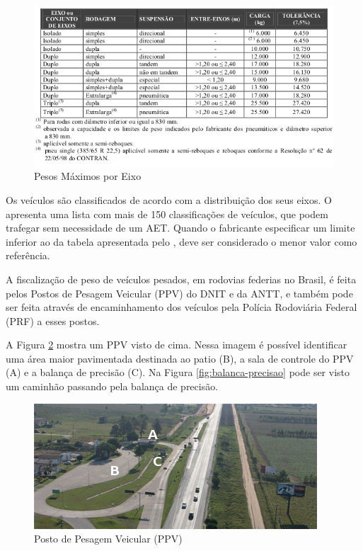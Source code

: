 \documentclass{ufscThesis}
\begin{document}
\begin{figure}[h!]
  \caption{Pesos Máximos por Eixo \cite{tech:dnit-qvf}}
  \label{fig:peso-max-por-eixo}
  \centering
    \includegraphics[scale=0.5]{./figuras/tabela-peso-por-eixo.png}
\end{figure}

Os veículos são classificados de acordo com a distribuição dos seus eixos. O  apresenta uma lista com mais de 150 classificações de veículos, que podem trafegar sem necessidade de um AET. Quando o fabricante especificar um limite inferior ao da tabela apresentada pelo , deve ser considerado o menor valor como referência.

A fiscalização de peso de veículos pesados, em rodovias federias no Brasil, é feita pelos Postos de Pesagem Veicular (PPV) do DNIT e da ANTT, e também pode ser feita através de encaminhamento dos veículos pela Polícia Rodoviária Federal (PRF) a esses postos.

A Figura \ref{fig:ppv} mostra um PPV visto de cima. Nessa imagem é possível identificar uma área maior pavimentada destinada ao patio (B), a sala de controle do PPV (A) e a balança de precisão (C). Na Figura \ref{fig:balanca-precisao} pode ser visto um caminhão passando pela balança de precisão.

\begin{figure}[h!]
  \caption{Posto de Pesagem Veicular (PPV)}
  \label{fig:ppv}
  \centering
    \includegraphics[scale=0.7]{./figuras/ppv_aerea_id.png}
\end{figure}
\end{document}
